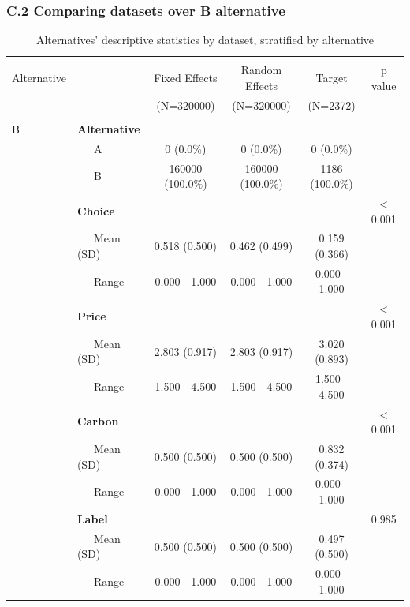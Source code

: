 \documentclass[12pt,]{article}
\begin{document}
\FloatBarrier

\newpage

\hypertarget{c.2-comparing-datasets-over-b-alternative}{%
\subsubsection*{C.2 Comparing datasets over B
alternative}\label{c.2-comparing-datasets-over-b-alternative}}

\FloatBarrier

\begin{table}[!htbp] \centering 
  \caption{Alternatives' descriptive statistics by dataset, stratified by alternative} 
  \label{tab:stratB} 
\begin{tabular}{@{\extracolsep{5pt}}llcccc}
\\[-1.8ex]\hline 
\hline \\[-1.8ex] 
Alternative &  & Fixed Effects  & Random Effects  & Target  & p value\\
 & & (N=320000) & (N=320000) & (N=2372) &  \\
\hline \\[-1.8ex] 
B & \textbf{Alternative} &  &  &  & \\
 & ~~~A & 0 (0.0\%) & 0 (0.0\%) & 0 (0.0\%) & \\
 & ~~~B & 160000 (100.0\%) & 160000 (100.0\%) & 1186 (100.0\%) & \\
 & \textbf{Choice} &  &  &  & < 0.001\\
 & ~~~Mean (SD) & 0.518 (0.500) & 0.462 (0.499) & 0.159 (0.366) & \\
 & ~~~Range & 0.000 - 1.000 & 0.000 - 1.000 & 0.000 - 1.000 & \\
 & \textbf{Price} &  &  &  & < 0.001\\
 & ~~~Mean (SD) & 2.803 (0.917) & 2.803 (0.917) & 3.020 (0.893) & \\
 & ~~~Range & 1.500 - 4.500 & 1.500 - 4.500 & 1.500 - 4.500 & \\
 & \textbf{Carbon} &  &  &  & < 0.001\\
 & ~~~Mean (SD) & 0.500 (0.500) & 0.500 (0.500) & 0.832 (0.374) & \\
 & ~~~Range & 0.000 - 1.000 & 0.000 - 1.000 & 0.000 - 1.000 & \\
 & \textbf{Label} &  &  &  & 0.985\\
 & ~~~Mean (SD) & 0.500 (0.500) & 0.500 (0.500) & 0.497 (0.500) & \\
 & ~~~Range & 0.000 - 1.000 & 0.000 - 1.000 & 0.000 - 1.000 & \\

\end{tabular}
\end{table}
\end{document}
